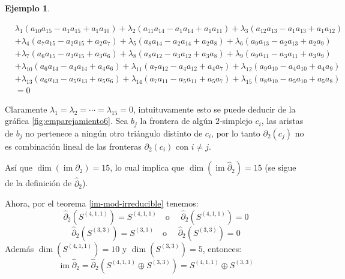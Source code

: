 \documentclass[12pt]{book}
\theoremstyle{definition}
\newtheorem{example}[theorem]{Ejemplo}
\DeclareMathOperator{\im}{im}
\newcounter{in}
\newcounter{ini}
\begin{document}
\begin{example}
\begin{footnotesize}
  \begin{align*}
    &\lambda_{1}(a_{10}a_{15}-a_{1}a_{15}+a_{1}a_{10})+\lambda_{2}(a_{11}a_{14}-a_{1}a_{14}+a_{1}a_{11})+\lambda_{3}(a_{12}a_{13}-a_{1}a_{13}+a_{1}a_{12})\\
    &+\lambda_{4}(a_{7}a_{15}-a_{2}a_{15}+a_{2}a_{7})+\lambda_{5}(a_{8}a_{14}-a_{2}a_{14}+a_{2}a_{8})+\lambda_{6}(a_{9}a_{13}-a_{2}a_{13}+a_{2}a_{9})\\
    &+\lambda_{7}(a_{6}a_{15}-a_{3}a_{15}+a_{3}a_{6})+\lambda_{8}(a_{8}a_{12}-a_{3}a_{12}+a_{3}a_{8})+\lambda_{9}(a_{9}a_{11}-a_{3}a_{11}+a_{3}a_{9})\\
    &+\lambda_{10}(a_{6}a_{14}-a_{4}a_{14}+a_{4}a_{6})+\lambda_{11}(a_{7}a_{12}-a_{4}a_{12}+a_{4}a_{7})+\lambda_{12}(a_{9}a_{10}-a_{4}a_{10}+a_{4}a_{9})\\
    &+\lambda_{13}(a_{6}a_{13}-a_{5}a_{13}+a_{5}a_{6})+\lambda_{14}(a_{7}a_{11}-a_{5}a_{11}+a_{5}a_{7})+\lambda_{15}(a_{8}a_{10}-a_{5}a_{10}+a_{5}a_{8})\\
    &=0
  \end{align*}
\end{footnotesize}
Claramente $\lambda_{1}=\lambda_{2}=\cdots=\lambda_{15}=0$,
intuituvamente esto se puede deducir de la gráfica
\ref{fig:emparejamiento6}. Sea $b_{j}$ la frontera de algún $2$-simplejo $c_{i}$, las aristas
de $b_{j}$ no pertenece a ningún otro triángulo distinto de $c_{i}$, por
lo tanto $\partial_{2}(c_{j})$ no es combinación lineal de las fronteras
$\partial_{2}(c_{i})$ con $i\neq j$.

Así que $\dim(\im\partial_{2})=15$, lo cual implica que
$\dim(\im\widehat\partial_{2})=15$ (se sigue de la definición de
$\widehat\partial_{2}$).

Ahora, por el teorema \ref{im-mod-irreducible} tenemos:
  $$\widehat\partial_{2}(S^{(4,1,1)})=S^{(4,1,1)} \quad \mbox{o }\quad \widehat\partial_{2}(S^{(4,1,1)})=0$$
  $$\widehat\partial_{2}(S^{(3,3)})=S^{(3,3)} \quad \mbox{o }\quad \widehat\partial_{2}(S^{(3,3)})=0$$
  Además $\dim(S^{(4,1,1)})=10$ y $\dim(S^{(3,3)})=5$, entonces:
  $$\im\widehat\partial_{2}=\widehat\partial_{2}(S^{(4,1,1)}\oplus
  S^{(3,3)})=S^{(4,1,1)}\oplus S^{(3,3)}$$

\end{example}
\end{document}
